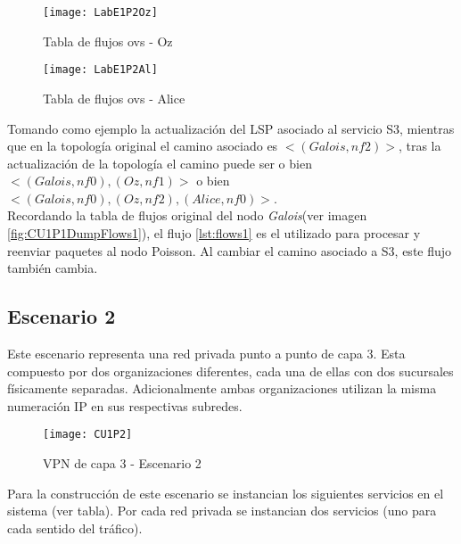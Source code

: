 \begin{figure}[h] 
\centering    
\texttt{[image: LabE1P2Oz]}
\caption[Tabla de flujos ovs - Oz]{Tabla de flujos ovs - Oz}
\label{fig:CU1P2DumpFlows2}
\end{figure}

\begin{figure}[h] 
\centering    
\texttt{[image: LabE1P2Al]}
\caption[Tabla de flujos ovs - Alice]{Tabla de flujos ovs - Alice}
\label{fig:CU1P2DumpFlows4}
\end{figure}

\newpage
Tomando como ejemplo la actualizaci\'on del LSP asociado al servicio S3, mientras que en la topolog\'ia original el camino asociado es $<(Galois, nf2)>$, tras la actualizaci\'on de la topolog\'ia el camino puede ser o bien $<(Galois, nf0),(Oz, nf1)>$ o bien \\ $<(Galois, nf0), (Oz, nf2), (Alice, nf0)>$.\\

Recordando la tabla de flujos original del nodo \textit{Galois}(ver imagen \ref{fig:CU1P1DumpFlows1}), el flujo \ref{lst:flows1} es el utilizado para procesar y reenviar paquetes al nodo Poisson. Al cambiar el camino asociado a S3, este flujo tambi\'en cambia. 

\newpage
\subsection{Escenario 2}

Este escenario representa una red privada punto a punto de capa 3. Esta compuesto por dos organizaciones diferentes, cada una de ellas con dos sucursales f\'isicamente separadas. Adicionalmente  ambas organizaciones utilizan la misma numeraci\'on IP en sus respectivas subredes.\\

\begin{figure}[ht!] 
\centering    
\texttt{[image: CU1P2]}
\caption[VPN de capa 3 - Escenario 2]{VPN de capa 3 - Escenario 2}
\label{fig:CUP2}
\end{figure}

Para la construcci\'on de este escenario se instancian los siguientes servicios en el sistema (ver tabla). Por cada red privada se instancian dos servicios (uno para cada sentido del tr\'afico).

